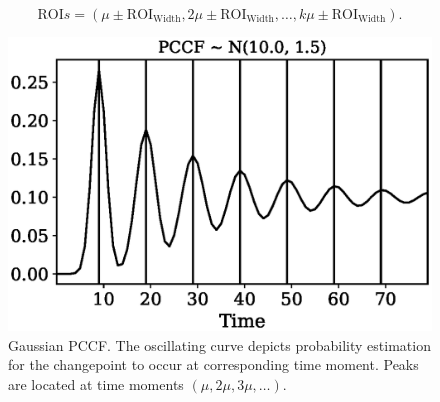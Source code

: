 \begin{equation}\label{eq:rois}
  \text{ROI}s = (\mu \pm \text{ROI}_{\text{Width}}, 2 \mu \pm \text{ROI}_{\text{Width}}, \dots , k \mu \pm \text{ROI}_{\text{Width}}).
\end{equation}
\begin{figure}[htb!]
	\centering
	\includegraphics[scale=0.5]{pics/journal_paper/pccf_example.eps}
	\caption{
    Gaussian PCCF.
		The oscillating curve depicts probability estimation for the changepoint to occur at corresponding time moment.
		Peaks are located at time moments $(\mu, 2 \mu, 3\mu, \dots)$.
	}
	\label{fig:pccf_example}
\end{figure}


